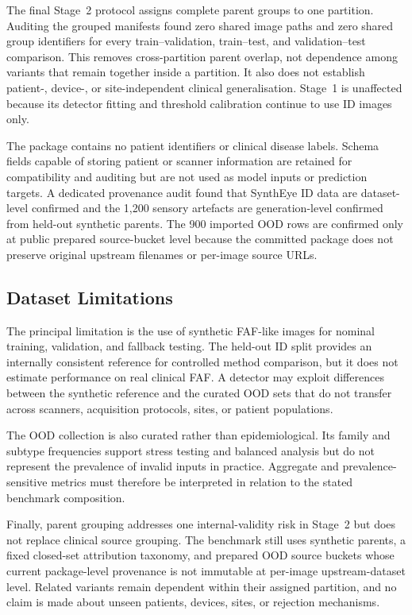 \documentclass[fleqn,12pt]{olplainarticle}
\begin{document}
The final Stage~2 protocol assigns complete parent groups to one partition.
Auditing the grouped manifests found zero shared image paths and zero shared
group identifiers for every train--validation, train--test, and
validation--test comparison. This removes cross-partition parent overlap, not
dependence among variants that remain together inside a partition. It also
does not establish patient-, device-, or site-independent clinical
generalisation. Stage~1 is unaffected because its detector fitting and
threshold calibration continue to use ID images only.

The package contains no patient identifiers or clinical disease labels.
Schema fields capable of storing patient or scanner information are retained
for compatibility and auditing but are not used as model inputs or prediction
targets. A dedicated provenance audit found that SynthEye ID data are
dataset-level confirmed and the 1,200 sensory artefacts are generation-level
confirmed from held-out synthetic parents. The 900 imported OOD rows are
confirmed only at public prepared source-bucket level because the committed
package does not preserve original upstream filenames or per-image source URLs.

\subsection{Dataset Limitations}
\label{subsec:dataset_limitations}

The principal limitation is the use of synthetic FAF-like images for nominal
training, validation, and fallback testing. The held-out ID split provides an
internally consistent reference for controlled method comparison, but it does
not estimate performance on real clinical FAF. A detector may exploit
differences between the synthetic reference and the curated OOD sets that do
not transfer across scanners, acquisition protocols, sites, or patient
populations.

The OOD collection is also curated rather than epidemiological. Its family
and subtype frequencies support stress testing and balanced analysis but do
not represent the prevalence of invalid inputs in practice. Aggregate and
prevalence-sensitive metrics must therefore be interpreted in relation to the
stated benchmark composition.

Finally, parent grouping addresses one internal-validity risk in Stage~2 but
does not replace clinical source grouping. The benchmark still uses synthetic
parents, a fixed closed-set attribution taxonomy, and prepared OOD source
buckets whose current package-level provenance is not immutable at per-image
upstream-dataset level. Related variants remain dependent within their assigned
partition, and no claim is made about unseen patients, devices, sites, or
rejection mechanisms.
\end{document}
